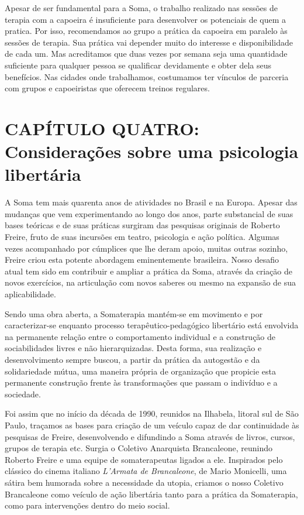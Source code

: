 Apesar de ser fundamental para a Soma, o trabalho realizado nas sessões
de terapia com a capoeira é insuficiente para desenvolver os potenciais
de quem a pratica. Por isso, recomendamos ao grupo a prática da capoeira
em paralelo às sessões de terapia. Sua prática vai depender muito do
interesse e disponibilidade de cada um. Mas acreditamos que duas vezes
por semana seja uma quantidade suficiente para qualquer pessoa se
qualificar devidamente e obter dela seus benefícios. Nas cidades onde
trabalhamos, costumamos ter vínculos de parceria com grupos e
capoeiristas que oferecem treinos regulares.

\chapter{CAPÍTULO QUATRO: Considerações sobre uma psicologia libertária}

A Soma tem mais quarenta anos de atividades no Brasil e na Europa.
Apesar das mudanças que vem experimentando ao longo dos anos, parte
substancial de suas bases teóricas e de suas práticas surgiram das
pesquisas originais de Roberto Freire, fruto de suas incursões em
teatro, psicologia e ação política. Algumas vezes acompanhado por
cúmplices que lhe deram apoio, muitas outras sozinho, Freire criou esta
potente abordagem eminentemente brasileira. Nosso desafio atual tem sido
em contribuir e ampliar a prática da Soma, através da criação de novos
exercícios, na articulação com novos saberes ou mesmo na expansão de sua
aplicabilidade.

Sendo uma obra aberta, a Somaterapia mantém-se em movimento e por
caracterizar-se enquanto processo terapêutico-pedagógico libertário está
envolvida na permanente relação entre o comportamento individual e a
construção de sociabilidades livres e não hierarquizadas. Desta forma,
sua realização e desenvolvimento sempre buscou, a partir da prática da
autogestão e da solidariedade mútua, uma maneira própria de organização
que propicie esta permanente construção frente às transformações que
passam o indivíduo e a sociedade.

Foi assim que no início da década de 1990, reunidos na Ilhabela, litoral
sul de São Paulo, traçamos as bases para criação de um veículo capaz de
dar continuidade às pesquisas de Freire, desenvolvendo e difundindo a
Soma através de livros, cursos, grupos de terapia etc. Surgia o Coletivo
Anarquista Brancaleone, reunindo Roberto Freire e uma equipe de
somaterapeutas ligados a ele. Inspirados pelo clássico do cinema
italiano \emph{L'Armata de Brancaleone}, de Mario Monicelli, uma sátira
bem humorada sobre a necessidade da utopia, criamos o nosso Coletivo
Brancaleone como veículo de ação libertária tanto para a prática da
Somaterapia, como para intervenções dentro do meio social.

